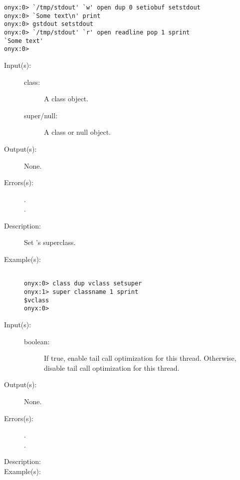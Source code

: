 \begin{description}
\begin{description}
\begin{verbatim}
onyx:0> `/tmp/stdout' `w' open dup 0 setiobuf setstdout
onyx:0> `Some text\n' print
onyx:0> gstdout setstdout
onyx:0> `/tmp/stdout' `r' open readline pop 1 sprint
`Some text'
onyx:0>
		\end{verbatim}
	\end{description}
\label{systemdict:setsuper}
\item[{\onyxop{class super/null}{setsuper}{--}}: ]
	\begin{description}\item[]
	\item[Input(s): ]
		\begin{description}\item[]
		\item[class: ]
			A class object.
		\item[super/null: ]
			A class or null object.
		\end{description}
	\item[Output(s): ] None.
	\item[Errors(s): ]
		\begin{description}\item[]
		\item[.]
		\item[.]
		\end{description}
	\item[Description: ]
		Set 's superclass.
	\item[Example(s): ]\begin{verbatim}

onyx:0> class dup vclass setsuper
onyx:1> super classname 1 sprint
$vclass
onyx:0>
		\end{verbatim}
	\end{description}
\label{systemdict:settailopt}
\item[{\onyxop{boolean}{settailopt}{--}}: ]
	\begin{description}\item[]
	\item[Input(s): ]
		\begin{description}\item[]
		\item[boolean: ]
			If true, enable tail call optimization for this thread.
			Otherwise, disable tail call optimization for this
			thread.
		\end{description}
	\item[Output(s): ] None.
	\item[Errors(s): ]
		\begin{description}\item[]
		\item[.]
		\item[.]
		\end{description}
	\item[Description: ]
	\item[Example(s): ]\begin{verbatim}


\end{verbatim}
\end{description}
\end{description}
